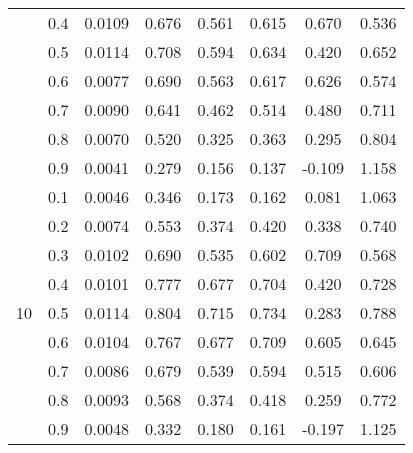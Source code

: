 \documentclass[11pt,a4paper]{report}
\begin{document}
\begin{longtable}{ | c | c || c | c | c | c | c | c | }
 & 0.4 & 0.0109 & 0.676 & 0.561 & 0.615 & 0.670 & 0.536 \\
 & 0.5 & 0.0114 & 0.708 & 0.594 & 0.634 & 0.420 & 0.652 \\
 & 0.6 & 0.0077 & 0.690 & 0.563 & 0.617 & 0.626 & 0.574 \\
 & 0.7 & 0.0090 & 0.641 & 0.462 & 0.514 & 0.480 & 0.711 \\
 & 0.8 & 0.0070 & 0.520 & 0.325 & 0.363 & 0.295 & 0.804 \\
 & 0.9 & 0.0041 & 0.279 & 0.156 & 0.137 & -0.109 & 1.158 \\
 \hline
\multirow{9}{*}{10} & 0.1 & 0.0046 & 0.346 & 0.173 & 0.162 & 0.081 & 1.063 \\
 & 0.2 & 0.0074 & 0.553 & 0.374 & 0.420 & 0.338 & 0.740 \\
 & 0.3 & 0.0102 & 0.690 & 0.535 & 0.602 & 0.709 & 0.568 \\
 & 0.4 & 0.0101 & 0.777 & 0.677 & 0.704 & 0.420 & 0.728 \\
 & 0.5 & 0.0114 & 0.804 & 0.715 & 0.734 & 0.283 & 0.788 \\
 & 0.6 & 0.0104 & 0.767 & 0.677 & 0.709 & 0.605 & 0.645 \\
 & 0.7 & 0.0086 & 0.679 & 0.539 & 0.594 & 0.515 & 0.606 \\
 & 0.8 & 0.0093 & 0.568 & 0.374 & 0.418 & 0.259 & 0.772 \\
 & 0.9 & 0.0048 & 0.332 & 0.180 & 0.161 & -0.197 & 1.125 \\
 \hline
\hline
\end{longtable}
\end{document}
